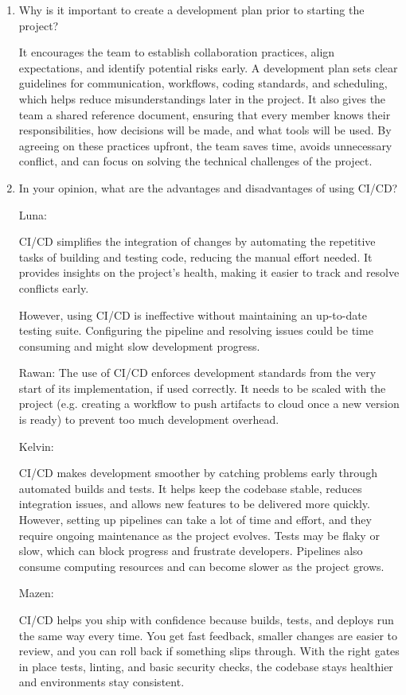 \documentclass{article}
\begin{document}
\begin{enumerate}
    \item Why is it important to create a development plan prior to starting the
    project?

    It encourages the team to establish collaboration practices, align expectations, and identify potential risks early. A development plan sets clear guidelines for communication, workflows, coding standards, and scheduling, which helps reduce misunderstandings later in the project. It also gives the team a shared reference document, ensuring that every member knows their responsibilities, how decisions will be made, and what tools will be used. By agreeing on these practices upfront, the team saves time, avoids unnecessary conflict, and can focus on solving the technical challenges of the project.

    \item In your opinion, what are the advantages and disadvantages of using
    CI/CD?
    
    Luna:

CI/CD simplifies the integration of changes by automating the repetitive tasks of building and testing code, reducing the manual effort needed. It provides insights on the project’s health, making it easier to track and resolve conflicts early. 

However, using CI/CD is ineffective without maintaining an up-to-date testing suite. Configuring the pipeline and resolving issues could be time consuming and might slow development progress.

Rawan: The use of CI/CD enforces development standards from the very start of its implementation, if used correctly. It needs to be scaled with the project (e.g. creating a workflow to push artifacts to cloud once a new version is ready) to prevent too much development overhead. 

Kelvin: 

CI/CD makes development smoother by catching problems early through automated builds and tests. It helps keep the codebase stable, reduces integration issues, and allows new features to be delivered more quickly. However, setting up pipelines can take a lot of time and effort, and they require ongoing maintenance as the project evolves. Tests may be flaky or slow, which can block progress and frustrate developers. Pipelines also consume computing resources and can become slower as the project grows.

Mazen:

CI/CD helps you ship with confidence because builds, tests, and deploys run the same way every time. You get fast feedback, smaller changes are easier to review, and you can roll back if something slips through. With the right gates in place tests, linting, and basic security checks, the codebase stays healthier and environments stay consistent.


\end{enumerate}
\end{document}
